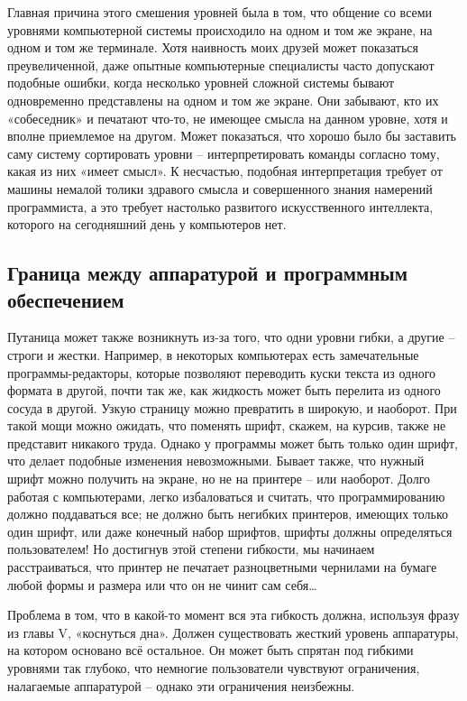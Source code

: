 \documentclass[../main.tex]{subfiles}
\begin{document}
Главная причина этого смешения уровней была в том, что общение со всеми уровнями компьютерной системы происходило на одном и том же экране, на одном и том же терминале. Хотя наивность моих друзей может показаться преувеличенной, даже опытные компьютерные специалисты часто допускают подобные ошибки, когда несколько уровней сложной системы бывают одновременно представлены на одном и том же экране. Они забывают, кто их «собеседник» и печатают что-то, не имеющее смысла на данном уровне, хотя и вполне приемлемое на другом. Может показаться, что хорошо было бы заставить саму систему сортировать уровни \--- интерпретировать команды согласно тому, какая из них «имеет смысл». К несчастью, подобная интерпретация требует от машины немалой толики здравого смысла и совершенного знания намерений программиста, а это требует настолько развитого искусственного интеллекта, которого на сегодняшний день у компьютеров нет.


\subsection{Граница между аппаратурой и программным обеспечением}

Путаница может также возникнуть из-за того, что одни уровни гибки, а другие \--- строги и жестки. Например, в некоторых компьютерах есть замечательные программы-редакторы, которые позволяют переводить куски текста из одного формата в другой, почти так же, как жидкость может быть перелита из одного сосуда в другой. Узкую страницу можно превратить в широкую, и наоборот. При такой мощи можно ожидать, что поменять шрифт, скажем, на курсив, также не представит никакого труда. Однако у программы может быть только один шрифт, что делает подобные изменения невозможными. Бывает также, что нужный шрифт можно получить на экране, но не на принтере \--- или наоборот. Долго работая с компьютерами, легко избаловаться и считать, что программированию должно поддаваться все; не должно быть негибких принтеров, имеющих только один шрифт, или даже конечный набор шрифтов, шрифты должны определяться пользователем! Но достигнув этой степени гибкости, мы начинаем расстраиваться, что принтер не печатает разноцветными чернилами на бумаге любой формы и размера или что он не чинит сам себя\ldots{}

Проблема в том, что в какой-то момент вся эта гибкость должна, используя фразу из главы V, «коснуться дна». Должен существовать жесткий уровень аппаратуры, на котором основано всё остальное. Он может быть спрятан под гибкими уровнями так глубоко, что немногие пользователи чувствуют ограничения, налагаемые аппаратурой \--- однако эти ограничения неизбежны.
\end{document}
